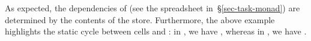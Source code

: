 \noindent
As expected, the dependencies of  (see the spreadsheet
in~\S\ref{sec-task-monad}) are determined by the contents of the store.
Furthermore, the above example highlights the static cycle between cells
 and : in , we have ,
whereas in , we have .

%
%



